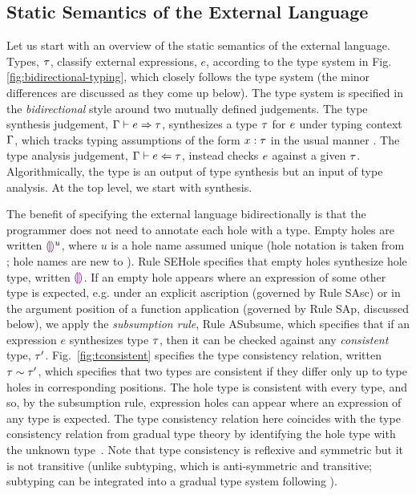 \subsection{Static Semantics of the External Language}
\label{sec:external-statics}




Let us start with an overview of the static semantics of the \HazelnutLive external language. Types, $\tau$, classify external expressions, $e$, according to the type system in Fig. \ref{fig:bidirectional-typing}, which closely follows the \Hazelnut type system \cite{popl-paper} (the minor differences are discussed as they come up below). The type system is specified in the \emph{bidirectional} style \cite{Pierce:2000ve,bidi-tutorial,DBLP:conf/icfp/DunfieldK13,Chlipala:2005da} around two mutually defined judgements. The type synthesis judgement, $\Gamma \vdash e \Rightarrow \tau$, synthesizes a type $\tau$ for $e$ under typing context $\Gamma$, which tracks typing assumptions of the form $x : \tau$ in the usual manner \cite{pfpl,tapl}. The type analysis judgement, $\Gamma \vdash e \Leftarrow \tau$, instead checks $e$ against a given $\tau$. Algorithmically, the type is an output of type synthesis but an input of type analysis. At the top level, we start with synthesis. %

The benefit of specifying the \HazelnutLive external language bidirectionally is that the programmer does not need to annotate each hole with a type. Empty holes are written $\textcolor{violet}{\llparenthesis}\textcolor{violet}{\rrparenthesis}^{u}$, where $u$ is a hole name assumed unique (hole notation is taken from \Hazelnut; hole names are new to \HazelnutLive). Rule {SEHole} specifies that empty holes synthesize hole type, written $\textcolor{violet}{\llparenthesis}\textcolor{violet}{\rrparenthesis}$. If an empty hole appears where an expression of some other type is expected, e.g. under an explicit ascription (governed by Rule {SAsc}) or in the argument position of a function application (governed by Rule {SAp}, discussed below), we apply the \emph{subsumption rule}, Rule {ASubsume}, which specifies that if an expression $e$ synthesizes type $\tau$, then it can be checked against any \emph{consistent} type, $\tau'$. Fig.~\ref{fig:tconsistent} specifies the type consistency relation, written $\tau \sim \tau'$, which specifies that two types are consistent if they differ only up to type holes in corresponding positions. The hole type is consistent with every type, and so, by the subsumption rule, expression holes can appear where an expression of any type is expected. The type consistency relation here coincides with the type consistency relation from gradual type theory by identifying the hole type with the unknown type~\cite{Siek06a}. Note that type consistency is reflexive and symmetric but it is not transitive (unlike subtyping, which is anti-symmetric and transitive; subtyping can be integrated into a gradual type system following \citet{Siek:2007qy}). 

